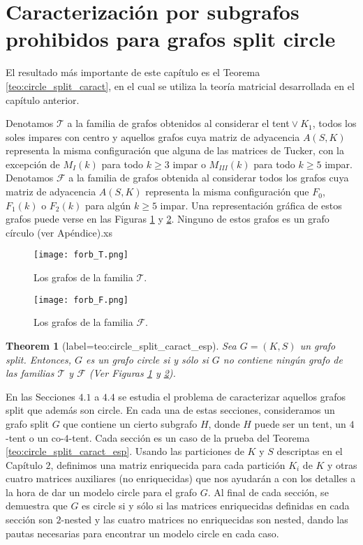 \documentclass[12pt]{book}
\theoremstyle{plain}
\newtheorem{teo}{Theorem}[chapter]
\theoremstyle{remark}
\begin{document}


%
\chapter*{Caracterización por subgrafos prohibidos para grafos split circle}


El resultado más importante de este capítulo es el Teorema \ref{teo:circle_split_caract}, en el cual se utiliza la teoría matricial desarrollada en el capítulo anterior. 

Denotamos $\mathcal{T}$ a la familia de grafos obtenidos al considerar el tent${}\vee{}K_1$, todos los soles impares con centro y aquellos grafos cuya matriz de adyacencia $A(S,K)$ representa la misma configuración que alguna de las matrices de Tucker, con la excepción de $M_I(k)$ para todo $k\geq 3$ impar o $M_{III}(k)$ para todo $k\geq 5$ impar.
Denotamos $\mathcal{F}$ a la familia de grafos obtenida al considerar todos los grafos cuya matriz de adyacencia $A(S,K)$ representa la misma configuración que $F_0$, $F_1(k)$ o $F_2(k)$ para algún $k \geq 5$ impar.
Una representación gráfica de estos grafos puede verse en las Figuras \ref{fig:forb_T_graphs_esp} y \ref{fig:forb_F_graphs_esp}. Ninguno de estos grafos es un grafo círculo (ver Apéndice).xs

\begin{figure}[h!]
\centering
\texttt{[image: forb\_T.png]} 
\caption{Los grafos de la familia $\mathcal{T}$.} \label{fig:forb_T_graphs_esp}
\end{figure}

\begin{figure}[h!]
\centering
\texttt{[image: forb\_F.png]} 
\caption{Los grafos de la familia  $\mathcal{F}$.} \label{fig:forb_F_graphs_esp}
\end{figure}


\begin{teo}[label={teo:circle_split_caract_esp}] 
	Sea $G=(K,S)$ un grafo split. Entonces, $G$ es un grafo circle si y sólo si $G$ no contiene ningún grafo de las familias $\mathcal{T}$ y $\mathcal{F}$ (Ver Figuras \ref{fig:forb_T_graphs_esp} y \ref{fig:forb_F_graphs_esp}).
\end{teo}

En las Secciones $4.1$ a $4.4$ se estudia el problema de caracterizar aquellos grafos split que además son circle. En cada una de estas secciones, consideramos un grafo split $G$ que contiene un cierto subgrafo $H$, donde $H$ puede ser un tent, un $4$-tent o un co-$4$-tent. Cada sección es un caso de la prueba del Teorema \ref{teo:circle_split_caract_esp}. 
Usando las particiones de $K$ y $S$ descriptas en el Capítulo $2$, definimos una matriz enriquecida para cada partición $K_i$ de $K$ y otras cuatro matrices auxiliares (no enriquecidas) que nos ayudarán a con los detalles a la hora de dar un modelo circle para el grafo $G$. Al final de cada sección, se demuestra que $G$ es circle si y sólo si las matrices enriquecidas definidas en cada sección son $2$-nested y las cuatro matrices no enriquecidas son nested, dando las pautas necesarias para encontrar un modelo circle en cada caso.
\end{document}

